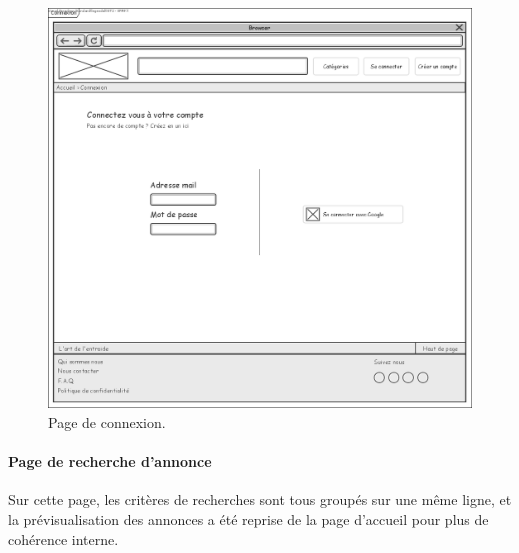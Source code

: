 \documentclass[a4paper,11pt]{article}
\begin{document}
\begin{figure}[H]
  \includegraphics[width=\linewidth]{images/maquette-connexion.png}
  \caption{Page de connexion.}
  \label{fig:maquette-connexion}
\end{figure}
\newpage

\paragraph{Page de recherche d'annonce}

Sur cette page, les critères de recherches sont tous groupés sur une même ligne,
et la prévisualisation des annonces a été reprise de la page d'accueil pour plus de cohérence interne.
\end{document}
